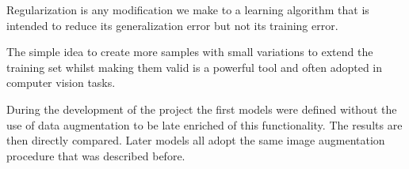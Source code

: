 Regularization is any modification we make to a learning algorithm that is intended to reduce its
generalization error but not its training error.

The simple idea to create more samples with small variations to extend the training set whilst making them valid
is a powerful tool and often adopted in computer vision tasks.


During the development of the project the first models were defined without the use of data augmentation
to be late enriched of this functionality. The results are then directly compared.
Later models all adopt the same image augmentation procedure that was described before.